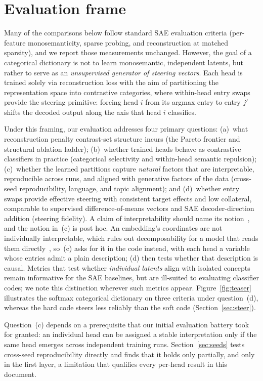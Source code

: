 \section{Evaluation frame}
\label{sec:frame}

Many of the comparisons below follow standard SAE evaluation criteria
(per-feature monosemanticity, sparse probing, and reconstruction at
matched sparsity), and we report those measurements unchanged. However,
the goal of a categorical dictionary is not to learn monosemantic,
independent latents, but rather to serve as an \emph{unsupervised
generator of steering vectors}. Each head is trained solely via
reconstruction loss with the aim of partitioning the representation space
into contrastive categories, where within-head entry swaps provide the
steering primitive: forcing head $i$ from its argmax entry to entry $j'$
shifts the decoded output along the axis that head $i$ classifies.

Under this framing, our evaluation addresses four primary questions:
(a)~what reconstruction penalty contrast-set structure incurs (the Pareto
frontier and structural ablation ladder);
(b)~whether trained heads behave as contrastive classifiers in practice
(categorical selectivity and within-head semantic repulsion);
(c)~whether the learned partitions capture \emph{natural} factors that
are interpretable, reproducible across runs, and aligned with generative
factors of the data (cross-seed reproducibility, language, and topic
alignment); and
(d)~whether entry swaps provide effective steering with consistent target
effects and low collateral, comparable to supervised difference-of-means
vectors and SAE decoder-direction addition (steering fidelity). A claim of
interpretability should name its notion~\cite[Sec.~4.2]{lipton2016}, and
the notion in~(c) is post hoc. An embedding's coordinates are not
individually interpretable, which rules out decomposability for a model
that reads them directly~\cite[Sec.~3.1.2]{lipton2016}, so~(c) asks for it
in the code instead, with each head a variable whose entries admit a plain
description; (d) then tests whether that description is causal. Metrics
that test whether \emph{individual latents} align with isolated concepts
remain informative for the SAE baselines, but are ill-suited to
evaluating classifier codes; we note this distinction wherever such
metrics appear. Figure~\ref{fig:teaser} illustrates the softmax
categorical dictionary on three criteria under question~(d), whereas the
hard code steers less reliably than the soft code
(Section~\ref{sec:steer}).

Question~(c) depends on a prerequisite that our initial evaluation
battery took for granted: an individual head can be assigned a stable
interpretation only if the same head emerges across independent training
runs. Section~\ref{sec:seeds} tests cross-seed reproducibility directly
and finds that it holds only partially, and only in the first layer, a
limitation that qualifies every per-head result in this document.
